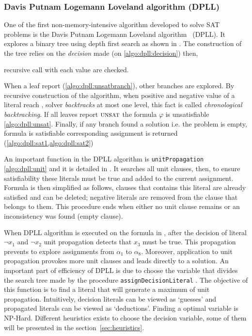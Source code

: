 \subsubsection{Davis Putnam Logemann Loveland algorithm (DPLL)}\label{sec:dpll}
One of the first non-memory-intensive algorithm developed to solve SAT problems is 
the Davis Putnam Logemann Loveland algorithm~\cite{dpll_62} (DPLL). 
It explores a binary tree using depth first search as shown in .
The construction of the tree  relies on the \emph{decision} made (on \cref{algo:dpll:decision}) then,


recursive call with each value are checked.


When a leaf report \unsat (\cref{algo:dpll:unsatbranch}), other branches are explored.
By recursive construction of the algorithm, when positive and negative value of a literal reach \unsat,
solver \emph{backtracks} at most one level, this fact is called \emph{chronological backtracking}.
If all leaves report $\textsc{unsat}$  the formula $\varphi$ is unsatisfiable \cref{algo:dpll:unsat}.
Finally, if any branch found a solution  i.e. the problem is empty,
formula is satisfiable corresponding assignment is returned (\cref{algo:dpll:sat1,algo:dpll:sat2})

An important function in the DPLL algorithm is \texttt{unitPropagation} \cref{algo:dpll:unit} and
it is detailed in . It searches all unit clauses, then, to ensure satisfiability these literals must be true
and added to the current assignment. Formula is then simplified as follows, clauses that contains this literal are already satisfied
and can be deleted; negative literals are removed from the clause that belongs to them.
This procedure ends when either no unit clause remains or an inconsistency was found (empty clause).


When DPLL algorithm is executed on the formula in , after the decision of literal
$\neg x_1$ and $\neg x_2$ unit propagation detects that $x_3$ must be true. This propagation prevents to 
explore assignments from $\alpha_1 $ to $\alpha_{8}$. Moreover, application to unit propagation 
provokes more unit clauses and leads directly to a solution. 
An important part of efficiency of DPLL is due to choose the variable that divides the search tree made by
the procedure \texttt{assignDecisionLiteral} . The objective of this function 
is to find a literal that will generate a maximum of unit propagation. Intuitively, decision literals 
can be viewed as ‘guesses’ and propagated literals can be viewed as ‘deductions’. Finding a optimal variable
is NP-Hard. Different heuristics exists to choose the decision variable,
some of them will be presented in the section~\ref{sec:heuristics}.


